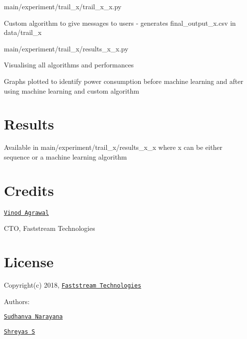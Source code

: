 \begin{DoxyEnumerate}
\item {\ttfamily main/experiment/trail\+\_\+x/trail\+\_\+x\+\_\+x.\+py}
\begin{DoxyItemize}
\item Custom algorithm to give messages to users -\/ generates {\ttfamily final\+\_\+output\+\_\+x.\+csv} in {\ttfamily data/trail\+\_\+x}
\end{DoxyItemize}
\item {\ttfamily main/experiment/trail\+\_\+x/results\+\_\+x\+\_\+x.\+py}
\begin{DoxyItemize}
\item Visualising all algorithms and performances
\item Graphs plotted to identify power consumption before machine learning and after using machine learning and custom algorithm
\end{DoxyItemize}
\end{DoxyEnumerate}

\section*{Results}

Available in {\ttfamily main/experiment/trail\+\_\+x/results\+\_\+x\+\_\+x} where \textquotesingle{}x\textquotesingle{} can be either sequence or a machine learning algorithm

\section*{Credits}

\href{https://in.linkedin.com/in/vinod-agrawal-8020488}{\tt Vinod Agrawal}

C\+TO, Faststream Technologies

\section*{License}

Copyright(c) 2018, \href{https://www.faststreamtech.com}{\tt Faststream Technologies}

Authors\+:


\begin{DoxyItemize}
\item \href{https://www.sudhanva.in}{\tt Sudhanva Narayana}
\item \href{https://www.shreyas.im}{\tt Shreyas S} 
\end{DoxyItemize}